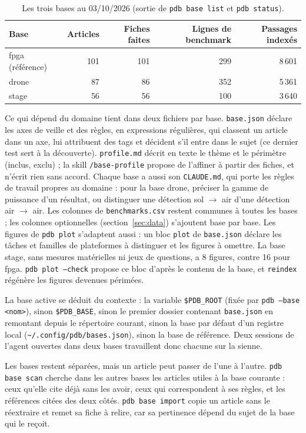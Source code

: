 \documentclass[11pt,a4paper]{article}
\newcommand{\cmd}[1]{\texttt{#1}}
\begin{document}
\begin{table}[ht]
\centering
\caption{Les trois bases au 03/10/2026 (sortie de \cmd{pdb base list} et \cmd{pdb status}).}
\label{tab:bases}
\small
\begin{tabular}{@{}lrrrr@{}}
\toprule
Base & Articles & Fiches faites & Lignes de benchmark & Passages indexés \\
\midrule
fpga (référence) & 101 & 101 & 299 & 8\,601 \\
drone & 87 & 86 & 352 & 5\,361 \\
stage & 56 & 56 & 100 & 3\,640 \\
\bottomrule
\end{tabular}
\end{table}

Ce qui dépend du domaine tient dans deux fichiers par base. \cmd{base.json} déclare les axes
de veille et des règles, en expressions régulières, qui classent un article dans un axe, lui
attribuent des tags et décident s'il entre dans le sujet (ce dernier test sert à la
découverte). \cmd{profile.md} décrit en texte le thème et le périmètre (inclus, exclu) ; la
skill \cmd{/base-profile} propose de l'affiner à partir des fiches, et n'écrit rien sans
accord. Chaque base a aussi son \cmd{CLAUDE.md}, qui porte les règles de travail propres au
domaine : pour la base drone, préciser la gamme de puissance d'un résultat, ou distinguer une
détection sol $\rightarrow$ air d'une détection air $\rightarrow$ air. Les colonnes de
\cmd{benchmarks.csv} restent communes à toutes les bases ; les colonnes optionnelles
(section~\ref{sec:data}) s'ajoutent base par base. Les figures de \cmd{pdb plot} s'adaptent
aussi : un bloc \cmd{plot} de \cmd{base.json} déclare les tâches et familles de plateformes
à distinguer et les figures à omettre. La base stage, sans mesures matérielles ni jeux de
questions, a 8 figures, contre 16 pour fpga. \cmd{pdb plot --check} propose ce bloc d'après le contenu de la base, et
\cmd{reindex} régénère les figures devenues périmées.

La base active se déduit du contexte : la variable \cmd{\$PDB\_ROOT} (fixée par
\cmd{pdb --base <nom>}), sinon \cmd{\$PDB\_BASE}, sinon le premier dossier contenant
\cmd{base.json} en remontant depuis le répertoire courant, sinon la base par défaut d'un
registre local (\cmd{\textasciitilde/.config/pdb/bases.json}), sinon la base de référence.
Deux sessions de l'agent ouvertes dans deux bases travaillent donc chacune sur la sienne.

Les bases restent séparées, mais un article peut passer de l'une à l'autre.
\cmd{pdb base scan} cherche dans les autres bases les articles utiles à la base courante :
ceux qu'elle cite déjà sans les avoir, ceux qui correspondent à ses règles, et les références
citées des deux côtés. \cmd{pdb base import} copie un article sans le réextraire et remet sa
fiche à relire, car sa pertinence dépend du sujet de la base qui le reçoit.
\end{document}
